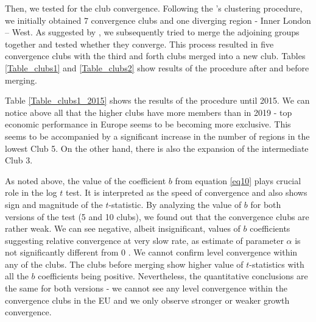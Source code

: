 \documentclass[11pt]{article}
\begin{document}
Then, we tested for the club convergence. Following the \citeauthor{phillips2007transition}'s clustering procedure, we initially obtained 7 convergence clubs and one diverging region - Inner London – West. As suggested by \citet{bartkowska2012regional}, we subsequently tried to merge the adjoining groups together and tested whether they converge. This process resulted in five convergence clubs with the third and forth clubs merged into a new club. Tables \ref{Table_clubs1} and \ref{Table_clubs2} show results of the procedure after and before merging.

Table \ref{Table_clubs1_2015} shows the results of the \citeauthor{phillips2007transition} procedure until 2015. We can notice above all that the higher clubs have more members than in 2019 - top economic performance in Europe seems to be becoming more exclusive. This seems to be accompanied by a significant increase in the number of regions in the lowest Club 5. On the other hand, there is also the expansion of the intermediate Club 3.

\begin{table}[!htbp] \centering 
 \caption{Convergence club classification after merging} 
  \label{Table_clubs1} 
\end{table}


As noted above, the value of the coefficient $b$ from equation \ref{eq10} plays crucial role in the log $t$ test. It is interpreted as the speed of convergence and also shows sign and magnitude of the $t$-statistic. By analyzing the value of $b$ for both versions of the test (5 and 10 clubs), we found out that the convergence clubs are rather weak. We can see negative, albeit insignificant, values of $b$ coefficients suggesting relative convergence at very slow rate, as estimate of parameter $\alpha$ is not significantly different from 0 \citep{phillips2007transition}. We cannot confirm level convergence within any of the clubs. 
The clubs before merging show higher value of $t$-statistics with all the $b$ coefficients being positive. Nevertheless, the quantitative conclusions are the same for both versions - we cannot see any level convergence within the convergence clubs in the EU and we only observe stronger or weaker growth convergence.
\end{document}

